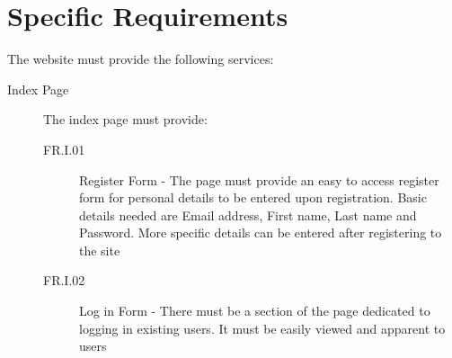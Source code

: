 \documentclass[11pt]{article}
\begin{document}
\section{Specific Requirements}
The website must provide the following services:
\begin{description}

\item[Index Page] The index page must provide:
\begin{description}
\item[FR.I.01] Register Form - The page must provide an easy to access register form for personal details to be entered upon registration. Basic details needed are Email address, First name, Last name and Password. More specific details can be entered after registering to the site
\item[FR.I.02] Log in Form - There must be a section of the page dedicated to logging in existing users. It must be easily viewed and apparent to users
\end{description}


\end{description}
\end{document}
